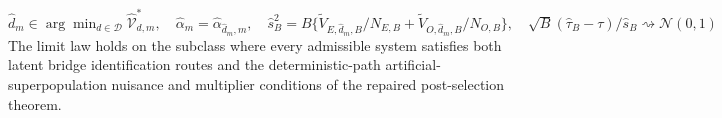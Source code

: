 \(\widehat d_m\in\arg\min_{d\in\mathcal D}\widehat{\mathcal V}_{d,m}^*,\quad\widehat\alpha_m=\widehat\alpha_{\widehat d_m,m},\quad\widehat s_B^2=B\{\widetilde V_{E,\widehat d_m,B}/N_{E,B}+\widetilde V_{O,\widehat d_m,B}/N_{O,B}\},\quad\sqrt B(\widehat\tau_B-\tau)/\widehat s_B\rightsquigarrow\mathcal N(0,1)\)
The limit law holds on the subclass where every admissible system satisfies both latent bridge identification routes and the deterministic-path artificial-superpopulation nuisance and multiplier conditions of the repaired post-selection theorem.